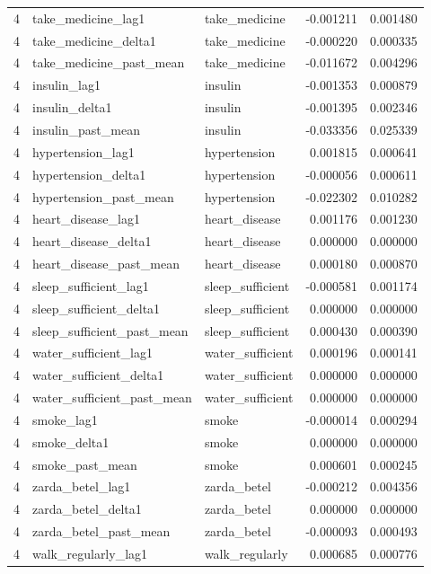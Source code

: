 \begin{longtable}{rllrr}
4 & take\_medicine\_lag1 & take\_medicine & -0.001211 & 0.001480 \\
4 & take\_medicine\_delta1 & take\_medicine & -0.000220 & 0.000335 \\
4 & take\_medicine\_past\_mean & take\_medicine & -0.011672 & 0.004296 \\
4 & insulin\_lag1 & insulin & -0.001353 & 0.000879 \\
4 & insulin\_delta1 & insulin & -0.001395 & 0.002346 \\
4 & insulin\_past\_mean & insulin & -0.033356 & 0.025339 \\
4 & hypertension\_lag1 & hypertension & 0.001815 & 0.000641 \\
4 & hypertension\_delta1 & hypertension & -0.000056 & 0.000611 \\
4 & hypertension\_past\_mean & hypertension & -0.022302 & 0.010282 \\
4 & heart\_disease\_lag1 & heart\_disease & 0.001176 & 0.001230 \\
4 & heart\_disease\_delta1 & heart\_disease & 0.000000 & 0.000000 \\
4 & heart\_disease\_past\_mean & heart\_disease & 0.000180 & 0.000870 \\
4 & sleep\_sufficient\_lag1 & sleep\_sufficient & -0.000581 & 0.001174 \\
4 & sleep\_sufficient\_delta1 & sleep\_sufficient & 0.000000 & 0.000000 \\
4 & sleep\_sufficient\_past\_mean & sleep\_sufficient & 0.000430 & 0.000390 \\
4 & water\_sufficient\_lag1 & water\_sufficient & 0.000196 & 0.000141 \\
4 & water\_sufficient\_delta1 & water\_sufficient & 0.000000 & 0.000000 \\
4 & water\_sufficient\_past\_mean & water\_sufficient & 0.000000 & 0.000000 \\
4 & smoke\_lag1 & smoke & -0.000014 & 0.000294 \\
4 & smoke\_delta1 & smoke & 0.000000 & 0.000000 \\
4 & smoke\_past\_mean & smoke & 0.000601 & 0.000245 \\
4 & zarda\_betel\_lag1 & zarda\_betel & -0.000212 & 0.004356 \\
4 & zarda\_betel\_delta1 & zarda\_betel & 0.000000 & 0.000000 \\
4 & zarda\_betel\_past\_mean & zarda\_betel & -0.000093 & 0.000493 \\
4 & walk\_regularly\_lag1 & walk\_regularly & 0.000685 & 0.000776 \\

\end{longtable}
